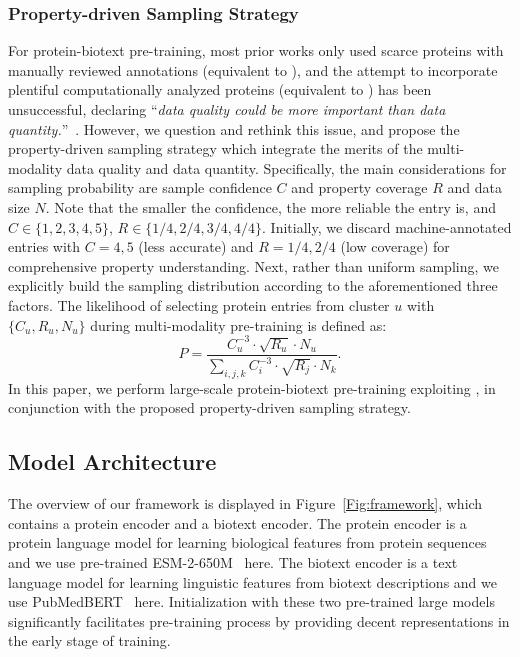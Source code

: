 \subsubsection{Property-driven Sampling Strategy}
For protein-biotext pre-training, most prior works only used scarce proteins with manually reviewed annotations (equivalent to \ourdatasetS), and the attempt to incorporate plentiful computationally analyzed proteins (equivalent to \ourdatasetD) has been unsuccessful, declaring ``\textit{data quality could be more important than data quantity.}''~\cite{ProtST}. However, we question and rethink this issue, and propose the property-driven sampling strategy which integrate the merits of the multi-modality data quality and data quantity. Specifically, the main considerations for sampling probability are sample confidence $C$ and property coverage $R$ and data size $N$. Note that the smaller the confidence, the more reliable the entry is, and $C \in \{1,2,3,4,5\}$, $R \in \{1/4, 2/4, 3/4, 4/4\}$.
Initially, we discard machine-annotated entries with $C=4,5$ (less accurate) and $R=1/4,2/4$ (low coverage) for comprehensive property understanding. 
Next, rather than uniform sampling, we explicitly build the sampling distribution according to the aforementioned three factors. 
The likelihood of selecting protein entries from cluster $u$ with $\{C_u, R_u, N_u\}$ during multi-modality pre-training is defined as:
\begin{equation}
    P = \frac{C_u^{-3} \cdot \sqrt{R_u} \cdot N_u}{\sum_{i,j,k} C_i^{-3} \cdot \sqrt{R_j} \cdot N_k}.
\end{equation}
In this paper, we perform large-scale protein-biotext pre-training exploiting \ourdatasetD, in conjunction with the proposed property-driven sampling strategy.

\subsection{Model Architecture}
The overview of our framework is displayed in Figure~\ref{Fig:framework}, which contains a protein encoder and a biotext encoder. The protein encoder is a protein language model for learning biological features from protein sequences and we use pre-trained ESM-2-650M~\cite{esm-2} here. The biotext encoder is a text language model for learning linguistic features from biotext descriptions and we use PubMedBERT~\cite{PubMedBERT} here. Initialization with these two pre-trained large models significantly facilitates pre-training process by providing decent representations in the early stage of training.

